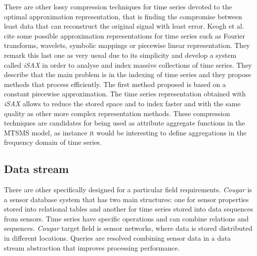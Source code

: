 There are other lossy compression techniques for time series devoted
to the optimal approximation representation, that is finding the
compromise between least data that can reconstruct the original signal
with least error. Keogh et al.\ \cite{keogh01} cite some possible
approximation representations for time series such as Fourier
transforms, wavelets, symbolic mappings or piecewise linear
representation. They remark this last one as very usual due to its
simplicity and develop a system called \emph{iSAX}
\cite{keogh08:isax,keogh10:isax} in order to analyse and index massive
collections of time series. They describe that the main problem is in
the indexing of time series and they propose methods that process
efficiently. The first method proposed is based on a constant
piecewise approximation. The time series representation obtained with
\emph{iSAX} allows to reduce the stored space and to index faster and
with the same quality as other more complex representation methods.
These compression techniques  are candidates for being used as
attribute aggregate functions in the MTSMS model, as instance it
would be interesting to define aggregations in the frequency domain of
time series.


 



 


\subsection{Data stream}



There are other  specifically designed for a particular
field requirements.  \emph{Cougar} \cite{bonnet01} is a sensor
database system that has two main structures: one for sensor
properties stored into relational tables and another for time series
stored into data sequences from sensors. Time series have specific
operations and can combine relations and sequences. \emph{Cougar}
target field is sensor networks, where data is stored distributed in
different locations. Queries are resolved combining sensor data in a
data stream abstraction that improves processing performance.

